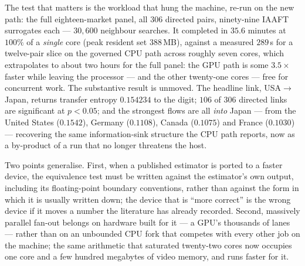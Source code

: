 The test that matters is the workload that hung the machine, re-run on the new
path: the full eighteen-market panel, all $306$ directed pairs, ninety-nine
IAAFT surrogates each --- $30{,}600$ neighbour searches. It completed in
$35.6$ minutes at $100\%$ of a \emph{single} core (peak resident set
$388$\,MB), against a measured $289$\,s for a twelve-pair slice on the governed
CPU path across roughly seven cores, which extrapolates to about two hours for
the full panel: the GPU path is some $3.5\times$ faster while leaving the
processor --- and the other twenty-one cores --- free for concurrent work. The
substantive result is unmoved. The headline link, USA$\to$Japan, returns
transfer entropy $0.154234$ to the digit; $106$ of $306$ directed links are
significant at $p<0.05$; and the strongest flows are all \emph{into} Japan ---
from the United States ($0.1542$), Germany ($0.1108$), Canada ($0.1075$) and
France ($0.1030$) --- recovering the same information-sink structure the CPU
path reports, now as a by-product of a run that no longer threatens the host.

Two points generalise. First, when a published estimator is ported to a faster
device, the equivalence test must be written against the estimator's own
output, including its floating-point boundary conventions, rather than against
the form in which it is usually written down; the device that is ``more
correct'' is the wrong device if it moves a number the literature has already
recorded. Second, massively parallel fan-out belongs on hardware built for it
--- a GPU's thousands of lanes --- rather than on an unbounded CPU fork that
competes with every other job on the machine; the same arithmetic that
saturated twenty-two cores now occupies one core and a few hundred megabytes of
video memory, and runs faster for it.
